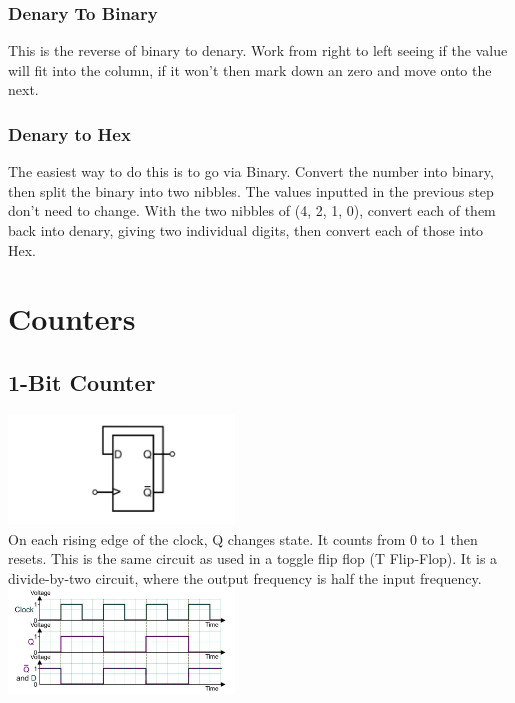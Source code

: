 \documentclass[a4paper,11pt, twocolumn]{article}
\begin{document}
\subsubsection{Denary To Binary}
This is the reverse of binary to denary. Work from right to left seeing if the value will fit into the column, if it won't then mark down an zero and move onto the next.
\subsubsection{Denary to Hex}
The easiest way to do this is to go via Binary. Convert the number into binary, then split the binary into two nibbles. The values inputted in the previous step don't need to change. With the two nibbles of (4, 2, 1, 0), convert each of them back into denary, giving two individual digits, then convert each of those into Hex. 

\section{Counters}
\subsection{1-Bit Counter}
\includegraphics[width=0.45\textwidth]{1BitCounter.jpg}\\
On each rising edge of the clock, Q changes state. It counts from 0 to 1 then resets. This is the same circuit as used in a toggle flip flop (T Flip-Flop). It is a divide-by-two circuit, where the output frequency is half the input frequency.
\includegraphics[width=0.45\textwidth]{1BitCountergraph.jpg}
\end{document}
